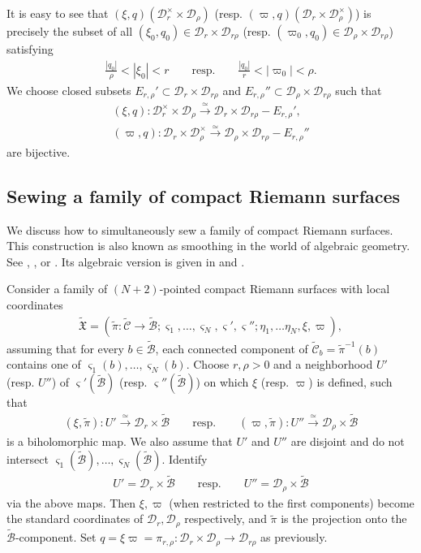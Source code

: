 \documentclass[12pt,a4paper,notitlepage]{article}
\theoremstyle{definition}
\theoremstyle{plain}
\newcommand{\fk}{\mathfrak}
\newcommand{\mc}{\mathcal}
\newcommand{\wtd}{\widetilde}
\newcommand{\sgm}{\varsigma}
\numberwithin{equation}{section}
\begin{document}
It is easy to see that  $(\xi,q)(\mc D_r^\times\times\mc D_\rho)$ (resp. $(\varpi,q)(\mc D_r\times\mc D_\rho^\times)$) is precisely the subset of all $(\xi_0,q_0)\in\mc D_r\times\mc D_{r\rho}$ (resp. $(\varpi_0,q_0)\in\mc D_\rho\times\mc D_{r\rho}$) satisfying
\begin{align}
\frac{|q_0|}{\rho}<|\xi_0|<r\qquad\text{resp.}\qquad  \frac{|q_0|}{r}<|\varpi_0|<\rho.
\end{align}
We choose closed subsets $E_{r,\rho}'\subset \mc D_r\times\mc D_{r\rho}$ and $E_{r,\rho}''\subset\mc D_\rho\times\mc D_{r\rho}$ such that
\begin{gather}
(\xi,q):\mc D_r^\times\times\mc D_\rho\xrightarrow{\simeq}\mc D_r\times\mc D_{r\rho}-E_{r,\rho}',\nonumber\\
(\varpi,q): \mc D_r\times\mc D_\rho^\times\xrightarrow{\simeq}\mc D_\rho\times\mc D_{r\rho}-E_{r,\rho}''\label{eq11}
\end{gather}
are bijective.




\subsection*{Sewing a family of compact Riemann surfaces}

We discuss how to simultaneously sew a family of compact Riemann surfaces. This construction is also known as smoothing in the world of algebraic geometry. See \cite[Sec. 6.1]{TUY89}, \cite[Sec. 5.3]{Ueno97}, or \cite[Sec. XI.3]{ACG11}. Its algebraic version is given in \cite[Sec. 6]{Loo10} and \cite[Sec. 8.1]{DGT19b}.


Consider a family of $(N+2)$-pointed compact Riemann surfaces with local coordinates
\begin{align}
\wtd{\fk X}=(\wtd\pi:\wtd{\mc C}\rightarrow\wtd{\mc B};\sgm_1,\dots,\sgm_N,\sgm',\sgm'';\eta_1,\dots\eta_N,\xi,\varpi),
\end{align}
assuming that for every $b\in\wtd{\mc B}$, each connected component of  $\wtd{\mc C}_b=\wtd\pi^{-1}(b)$ contains one of $\sgm_1(b),\dots,\sgm_N(b)$. Choose $r,\rho>0$ and a neighborhood $U'$ (resp. $U''$) of $\sgm'(\wtd {\mc B})$ (resp. $\sgm''(\wtd {\mc B})$) on which $\xi$ (resp. $\varpi$) is defined, such that 
\begin{gather}
(\xi,\wtd\pi):U'\xrightarrow{\simeq} \mc D_{r}\times\wtd{\mc B}\qquad\text{resp.}\qquad (\varpi,\wtd\pi):U''\xrightarrow{\simeq} \mc D_{\rho}\times\wtd{\mc B}\label{eq84}
\end{gather}
is a biholomorphic map. We also assume that $U'$ and $ U''$ are disjoint and do not intersect $\sgm_1(\wtd{\mc B}),\dots,\sgm_N(\wtd{\mc B})$. Identify
\begin{gather*}
U'=\mc D_{r}\times\wtd{\mc B}\qquad\text{resp.}\qquad U''=\mc D_{\rho}\times\wtd{\mc B}
\end{gather*}
via the above maps. Then $\xi,\varpi$ (when restricted to the first components) become the standard coordinates of $\mc D_{r},\mc D_{\rho}$ respectively, and $\wtd\pi$ is the projection onto the $\wtd{\mc B}$-component. Set $q=\xi\varpi=\pi_{r,\rho}:\mc D_{r}\times\mc D_{\rho}\rightarrow\mc D_{r\rho}$ as previously.  
\end{document}
